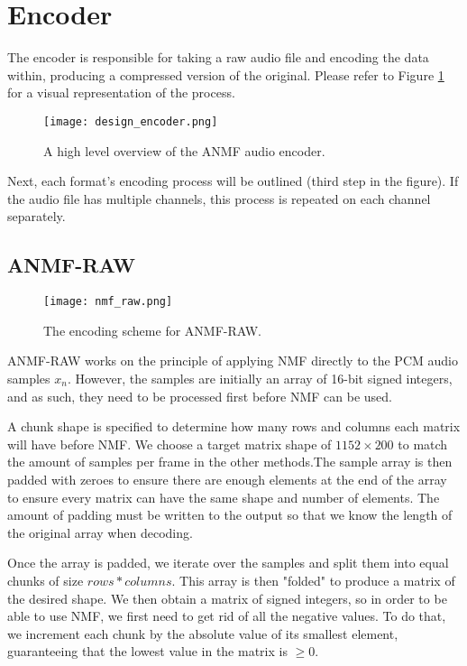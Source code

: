 \section{Encoder}
\label{sec:encoder}
The encoder is responsible for taking a raw audio file and encoding the data within, producing a compressed version of the original. Please refer to Figure \ref{fig:design_encoder} for a visual representation of the process.

\begin{figure}[ht]
	\caption[Encoder overview]{A high level overview of the ANMF audio encoder.}
	\label{fig:design_encoder}
	\centering
	\texttt{[image: design\_encoder.png]}
\end{figure}

Next, each format's encoding process will be outlined (third step in the figure). If the audio file has multiple channels, this process is repeated on each channel separately.

\subsection{ANMF-RAW}
\begin{figure}[ht]
	\caption[ANMF-RAW Encoder]{The encoding scheme for ANMF-RAW.}
	\label{fig:encoding_nmf_raw}
	\centering
	\texttt{[image: nmf\_raw.png]}
\end{figure}

ANMF-RAW works on the principle of applying NMF directly to the PCM audio samples $x_n$. However, the samples are initially an array of 16-bit signed integers, and as such, they need to be processed first before NMF can be used.

A chunk shape is specified to determine how many rows and columns each matrix will have before NMF. We choose a target matrix shape of $1152 \times 200$ to match the amount of samples per frame in the other methods.The sample array is then padded with zeroes to ensure there are enough elements at the end of the array to ensure every matrix can have the same shape and number of elements. The amount of padding must be written to the output so that we know the length of the original array when decoding.

Once the array is padded, we iterate over the samples and split them into equal chunks of size $rows*columns$. This array is then "folded" to produce a matrix of the desired shape. We then obtain a matrix of signed integers, so in order to be able to use NMF, we first need to get rid of all the negative values. To do that, we increment each chunk by the absolute value of its smallest element, guaranteeing that the lowest value in the matrix is $\ge 0$.

